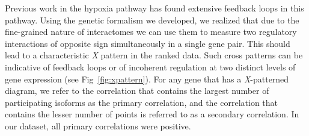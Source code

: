 \documentclass[9pt,twocolumn,twoside]{pnas-new}
\begin{document}
Previous work in the hypoxia pathway has found extensive feedback loops in this
pathway. Using the genetic formalism we developed, we realized that due to the
fine-grained nature of interactomes we can use them to measure two regulatory
interactions of opposite sign simultaneously in a single gene pair.
This should lead to a characteristic \emph{X} pattern in the ranked data. Such
cross patterns can be indicative of feedback loops or of incoherent regulation
at two distinct levels of gene expression (see Fig~\ref{fig:xpattern}). For any
gene that has a \emph{X}-patterned diagram, we refer to the correlation that
contains the largest number of participating isoforms as the primary correlation,
and the correlation that contains the lesser number of points is referred to as
a secondary correlation. In our dataset, all primary correlations were positive.
\end{document}
